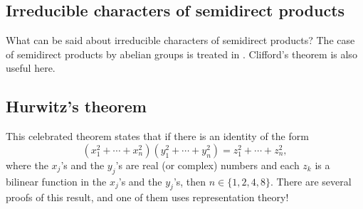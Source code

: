 \subsection*{Irreducible characters of semidirect products}

What can be said about irreducible characters
of semidirect products? The case of 
semidirect products by abelian groups is treated 
in \cite[Section 8.2]{MR0450380}. Clifford's theorem is also useful 
here. 

\subsection*{Hurwitz's theorem}

This celebrated theorem states that 
if there is an identity of the form 
	\begin{equation*}
		(x_1^2+\cdots+x_n^2)(y_1^2+\cdots+y_n^2)=z_1^2+\cdots+z_n^2,
	\end{equation*}
	where the $x_j$'s and the $y_j$'s are real (or complex) numbers and
	each $z_k$ is a bilinear function in the $x_j$'s and the $y_j$'s, then 
	$n\in\{1,2,4,8\}$. There are several 
    proofs of this result, and one of them uses representation theory! 





